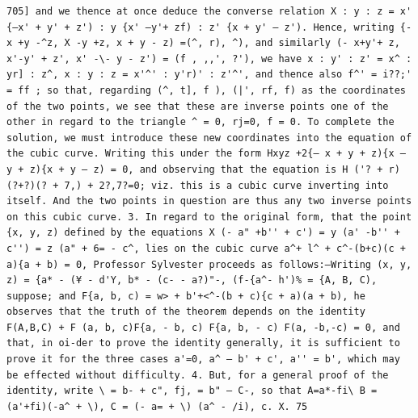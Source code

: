 \documentclass[12pt]{article}
\theoremstyle{plain}
\begin{document}
\newpage
\setcounter{page}{593}
\begin{verbatim}
705] and we thence at once deduce the converse relation X : y : z = x' {—x' + y' + z') : y {x' —y'+ zf) : z' {x + y' — z'). Hence, writing {-x +y -^z, X -y +z, x + y - z) =(^, r), ^), and similarly (- x+y'+ z, x'-y' + z', x' -\- y - z') = (f , ,,', ?'), we have x : y' : z' = x^ : yr] : z^, x : y : z = x'^' : y'r)' : z'^', and thence also f^' = i??;' = ff ; so that, regarding (^, t], f ), (|', rf, f) as the coordinates of the two points, we see that these are inverse points one of the other in regard to the triangle ^ = 0, rj=0, f = 0. To complete the solution, we must introduce these new coordinates into the equation of the cubic curve. Writing this under the form Hxyz +2{— x + y + z){x — y + z){x + y — z) = 0, and observing that the equation is H ('? + r) (?+?)(? + 7,) + 2?,7?=0; viz. this is a cubic curve inverting into itself. And the two points in question are thus any two inverse points on this cubic curve. 3. In regard to the original form, that the point {x, y, z) defined by the equations X (- a" +b'' + c') = y (a' -b'' + c'') = z (a" + 6= - c^, lies on the cubic curve a^+ l^ + c^-(b+c)(c + a){a + b) = 0, Professor Sylvester proceeds as follows:—Writing (x, y, z) = {a* - (¥ - d'Y, b* - (c- - a?)"-, (f-{a^- h')% = {A, B, C), suppose; and F{a, b, c) = w> + b'+<^-(b + c){c + a)(a + b), he observes that the truth of the theorem depends on the identity F(A,B,C) + F (a, b, c)F{a, - b, c) F{a, b, - c) F(a, -b,-c) = 0, and that, in oi-der to prove the identity generally, it is sufficient to prove it for the three cases a'=0, a^ — b' + c', a'' = b', which may be effected without difficulty. 4. But, for a general proof of the identity, write \ = b- + c", fj, = b" — C-, so that A=a*-fi\ B = (a'+fi)(-a^ + \), C = (- a= + \) (a^ - /i), c. X. 75 
\end{verbatim}
\end{document}
